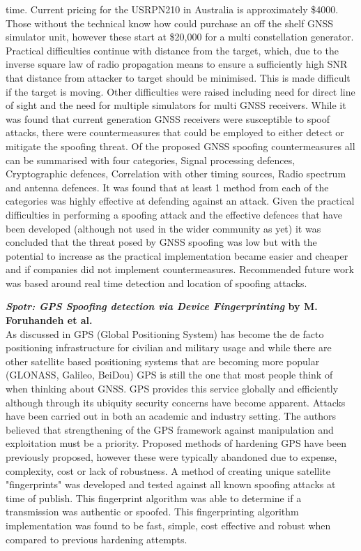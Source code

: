 time. Current pricing for the USRPN210 in Australia is approximately \$4000. 
Those without the technical know how could purchase an off the shelf GNSS simulator unit, however these start at \$20,000 for a multi constellation generator. Practical
difficulties continue with distance from the target, which, due to the inverse square law of radio propagation means to ensure a sufficiently high SNR that distance from
attacker to target should be minimised. This is made difficult if the target is moving. Other difficulties were raised including need for direct line of sight and the need for
multiple simulators for multi GNSS receivers. 
While it was found that current generation GNSS receivers were susceptible to spoof attacks, there were countermeasures that could be employed to either detect or
mitigate the spoofing threat. Of the proposed GNSS spoofing countermeasures all can be summarised with four categories, Signal processing defences, Cryptographic
defences, Correlation with other timing sources, Radio spectrum and antenna defences. It was found that at least 1 method from each of the categories was highly effective
at defending against an attack. Given the practical difficulties in performing a spoofing attack and the effective defences that have been developed (although not used in
the wider community as yet) it was concluded that the threat posed by GNSS spoofing was low but with the potential to increase as the practical implementation became
easier and cheaper and if companies did not implement countermeasures.
Recommended future work was based around real time detection and location of spoofing attacks.

\medskip

\textbf{\emph{Spotr: GPS Spoofing detection via Device Fingerprinting} by M. Foruhandeh et al.}\\
As discussed in \cite{RN7} GPS (Global Positioning System) has become the de facto positioning infrastructure for civilian and military usage and while there are other
satellite based positioning systems that are becoming more popular (GLONASS, Galileo, BeiDou) GPS is still the one that most people think of when thinking about GNSS. GPS
provides this service globally and efficiently although through its ubiquity security concerns have become apparent. Attacks have been carried out in both an academic and
industry setting. The authors believed that strengthening of the GPS framework against manipulation and exploitation must be a priority. Proposed methods of hardening GPS
have been previously proposed, however these were typically abandoned due to expense, complexity, cost or lack of robustness. A method of creating unique satellite
"fingerprints" was developed and tested against all known spoofing attacks at time of publish. This fingerprint algorithm was able to determine if a transmission was
authentic or spoofed. This fingerprinting algorithm implementation was found to be fast, simple, cost effective and robust when compared to previous hardening attempts.

